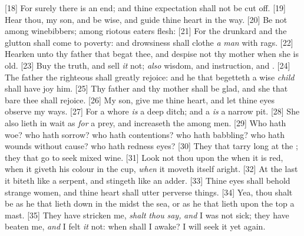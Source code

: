 [18] \textcolor[cmyk]{0.99998,1,0,0}{For surely there is an end; and thine expectation shall not be cut off.}
[19] \textcolor[cmyk]{0.99998,1,0,0}{Hear thou, my son, and be wise, and guide thine heart in the way.}
[20] \textcolor[cmyk]{0.99998,1,0,0}{Be not among winebibbers; among riotous eaters  flesh:}
[21] \textcolor[cmyk]{0.99998,1,0,0}{For the drunkard and the glutton shall come to poverty: and drowsiness shall clothe \emph{a} \emph{man} with rags.}
[22] \textcolor[cmyk]{0.99998,1,0,0}{Hearken unto thy father that begat thee, and despise not thy mother when she is old.}
[23] \textcolor[cmyk]{0.99998,1,0,0}{Buy the truth, and sell \emph{it} not; \emph{also} wisdom, and instruction, and  .}
[24] \textcolor[cmyk]{0.99998,1,0,0}{The father  the righteous shall greatly rejoice: and he that begetteth a wise \emph{child} shall have joy  him.}
[25] \textcolor[cmyk]{0.99998,1,0,0}{Thy father and thy mother shall be glad, and she that bare thee shall rejoice.}
[26] \textcolor[cmyk]{0.99998,1,0,0}{My son, give me thine heart, and let thine eyes observe my ways.}
[27] \textcolor[cmyk]{0.99998,1,0,0}{For a whore \emph{is} a deep ditch; and a   \emph{is} a narrow pit.}
[28] \textcolor[cmyk]{0.99998,1,0,0}{She also lieth in wait as \emph{for} a prey, and increaseth the   among men.}
[29] \textcolor[cmyk]{0.99998,1,0,0}{Who hath woe? who hath sorrow? who hath contentions? who hath babbling? who hath wounds without cause? who hath redness  eyes?}
[30] \textcolor[cmyk]{0.99998,1,0,0}{They that tarry long at the  ; they that go to seek mixed wine.}
[31] \textcolor[cmyk]{0.99998,1,0,0}{Look not thou upon the   when it is red, when it giveth his colour in the cup, \emph{when} it moveth itself aright.}
[32] \textcolor[cmyk]{0.99998,1,0,0}{At the last it biteth like a serpent, and stingeth like an adder.}
[33] \textcolor[cmyk]{0.99998,1,0,0}{Thine eyes shall behold strange women, and thine heart shall utter perverse things.}
[34] \textcolor[cmyk]{0.99998,1,0,0}{Yea, thou shalt be as he that lieth down in the midst  the sea, or as he that lieth upon the top  a mast.}
[35] \textcolor[cmyk]{0.99998,1,0,0}{They have stricken me, \emph{shalt} \emph{thou} \emph{say,} \emph{and} I was not sick; they have beaten me, \emph{and} I felt \emph{it} not: when shall I awake? I will seek it yet again.}


